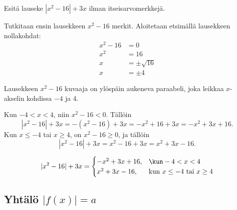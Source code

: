 
\begin{esimerkki}
	Esitä lauseke $|x^2-16|+3x$ ilman itseisarvomerkkejä.
	\begin{esimratk}
		Tutkitaan ensin lausekkeen $x^2-16$ merkit. Aloitetaan etsimällä lausekkeen nollakohdat:
		\begin{align*}
			x^2-16 & =0 \\
			x^2 & =16 \\
			x & =\pm\sqrt{16} \\
			x & =\pm 4
		\end{align*}
		
		Lausekkeen $x^2-16$ kuvaaja on ylöspäin aukeneva paraabeli, joka leikkaa $x$-akselin kohdissa $-4$ ja $4$.
		
		\begin{lukusuora}{-10}{10}{8}
		\end{lukusuora}

		Kun $-4<x<4$, niin $x^2-16<0$. Tällöin
		\[ |x^2-16|+3x = -(x^2-16)+3x = -x^2+16+3x=-x^2+3x+16. \]
		Kun $x\leq-4$ tai $x\geq4$, on $x^2-16\geq0$, ja tällöin
		\[ |x^2-16|+3x =x^2-16+3x=x^2+3x-16. \]
	\end{esimratk}
	\begin{esimvast}
		\[ |x^2-16|+3x = \begin{cases}
			-x^2+3x+16, & \kun -4<x<4 \\
			x^2+3x-16, & \text{kun $x\leq -4$ tai $x\geq 4$}
		\end{cases} \]
	\end{esimvast}
\end{esimerkki}

\subsection*{Yhtälö $|f(x)|=a$}

